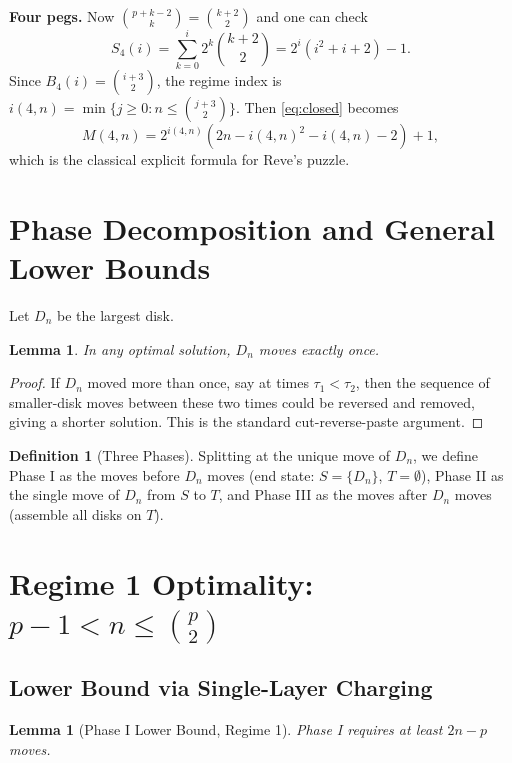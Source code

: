 \documentclass[11pt]{article}
\newtheorem{lemma}[theorem]{Lemma}
\theoremstyle{definition}
\newtheorem{definition}{Definition}
\begin{document}
\textbf{Four pegs.} Now $\binom{p+k-2}{k} = \binom{k+2}{2}$ and one can check
\begin{equation}\label{eq:S4}
S_4(i) = \sum_{k=0}^{i} 2^k\binom{k+2}{2} = 2^i(i^2 + i + 2) - 1.
\end{equation}
Since $B_4(i) = \binom{i+3}{2}$, the regime index is $i(4,n) = \min\{j \geq 0 : n \leq \binom{j+3}{2}\}$. Then \eqref{eq:closed} becomes
\[
M(4,n) = 2^{i(4,n)}\left(2n - i(4,n)^2 - i(4,n) - 2\right) + 1,
\]
which is the classical explicit formula for Reve's puzzle.

\section{Phase Decomposition and General Lower Bounds}

Let $D_n$ be the largest disk.

\begin{lemma}\label{lem:unique}
In any optimal solution, $D_n$ moves exactly once.
\end{lemma}

\begin{proof}
If $D_n$ moved more than once, say at times $\tau_1 < \tau_2$, then the sequence of smaller-disk moves between these two times could be reversed and removed, giving a shorter solution. This is the standard cut-reverse-paste argument.
\end{proof}

\begin{definition}[Three Phases]
Splitting at the unique move of $D_n$, we define Phase I as the moves before $D_n$ moves (end state: $S = \{D_n\}$, $T = \emptyset$), Phase II as the single move of $D_n$ from $S$ to $T$, and Phase III as the moves after $D_n$ moves (assemble all disks on $T$).
\end{definition}

\section{Regime 1 Optimality: $p-1 < n \leq \binom{p}{2}$}

\subsection{Lower Bound via Single-Layer Charging}

\begin{lemma}[Phase I Lower Bound, Regime 1]\label{lem:phase1-lower}
Phase I requires at least $2n-p$ moves.
\end{lemma}
\end{document}
